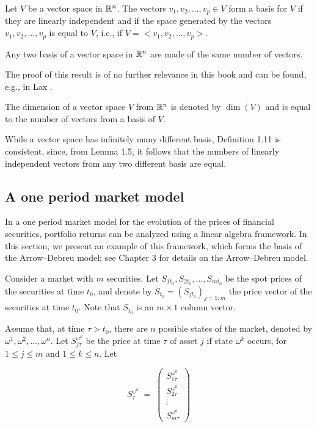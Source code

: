 \begin{definition}
Let $V$ be a vector space in $\mathbb{R}^n$. The vectors $v_1,v_2,\ldots,v_p \in V$
form a basis for $V$ if they are linearly independent and if the space
generated by the vectors $v_1,v_2,\ldots,v_p$ is equal to $V$, i.e., if
$V = <v_1,v_2,\ldots,v_p>$.
\end{definition}

\begin{lemma}
Any two basis of a vector space in $\mathbb{R}^n$ are made of the same number of
vectors.
\end{lemma}

The proof of this result is of no further relevance in this book and can
be found, e.g., in Lax \cite{26}.

\begin{definition}
The dimension of a vector space $V$ from $\mathbb{R}^n$ is denoted by $\dim(V)$ and
is equal to the number of vectors from a basis of $V$.
\end{definition}

While a vector space has infinitely many different basis, Definition 1.11
is consistent, since, from Lemma 1.5, it follows that the numbers of
linearly independent vectors from any two different basis are equal.

\subsection{A one period market model}

In a one period market model for the evolution of the prices of financial
securities, portfolio returns can be analyzed using a linear algebra
framework. In this section, we present an example of this framework, which
forms the basis of the Arrow--Debreu model; see Chapter 3 for details on
the Arrow--Debreu model.

Consider a market with $m$ securities. Let $S_{1t_0}, S_{2t_0}, \ldots,
S_{mt_0}$ be the spot prices of the securities at time $t_0$, and denote by
$S_{t_0} = (S_{jt_0})_{j=1:m}$ the price vector of the securities at time
$t_0$. Note that $S_{t_0}$ is an $m\times 1$ column vector.

Assume that, at time $\tau > t_0$, there are $n$ possible states of the
market, denoted by $\omega^1, \omega^2, \ldots, \omega^n$. Let
$S_{j\tau}^{\omega^k}$ be the price at time $\tau$ of asset $j$ if state
$\omega^k$ occurs, for $1\le j\le m$ and $1\le k\le n$. Let

\[
S_\tau^{\omega^k} \;=\;
\begin{pmatrix} S_{1\tau}^{\omega^k} \\ S_{2\tau}^{\omega^k} \\ \vdots \\
S_{m\tau}^{\omega^k} \end{pmatrix}
\]

